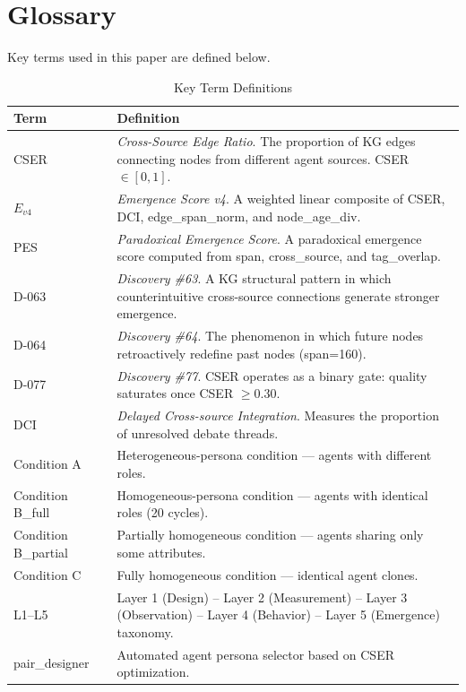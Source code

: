 \documentclass[12pt]{article}
\begin{document}
\appendix

\section{Glossary}
\label{sec:glossary}

Key terms used in this paper are defined below.

\begin{table}[h]
\centering
\caption{Key Term Definitions}
\label{tab:glossary}
\begin{tabular}{p{3cm}p{10cm}}
\toprule
\textbf{Term} & \textbf{Definition} \\
\midrule
CSER & \textit{Cross-Source Edge Ratio}. The proportion of KG edges connecting nodes from different agent sources. CSER $\in [0, 1]$. \\
\midrule
$E_{v4}$ & \textit{Emergence Score v4}. A weighted linear composite of CSER, DCI, edge\_span\_norm, and node\_age\_div. \\
\midrule
PES & \textit{Paradoxical Emergence Score}. A paradoxical emergence score computed from span, cross\_source, and tag\_overlap. \\
\midrule
D-063 & \textit{Discovery \#63}. A KG structural pattern in which counterintuitive cross-source connections generate stronger emergence. \\
\midrule
D-064 & \textit{Discovery \#64}. The phenomenon in which future nodes retroactively redefine past nodes (span=160). \\
\midrule
D-077 & \textit{Discovery \#77}. CSER operates as a binary gate: quality saturates once CSER $\geq 0.30$. \\
\midrule
DCI & \textit{Delayed Cross-source Integration}. Measures the proportion of unresolved debate threads. \\
\midrule
Condition A & Heterogeneous-persona condition --- agents with different roles. \\
\midrule
Condition B\_full & Homogeneous-persona condition --- agents with identical roles (20 cycles). \\
\midrule
Condition B\_partial & Partially homogeneous condition --- agents sharing only some attributes. \\
\midrule
Condition C & Fully homogeneous condition --- identical agent clones. \\
\midrule
L1--L5 & Layer 1 (Design) -- Layer 2 (Measurement) -- Layer 3 (Observation) -- Layer 4 (Behavior) -- Layer 5 (Emergence) taxonomy. \\
\midrule
pair\_designer & Automated agent persona selector based on CSER optimization. \\
\bottomrule
\end{tabular}
\end{table}
\end{document}
